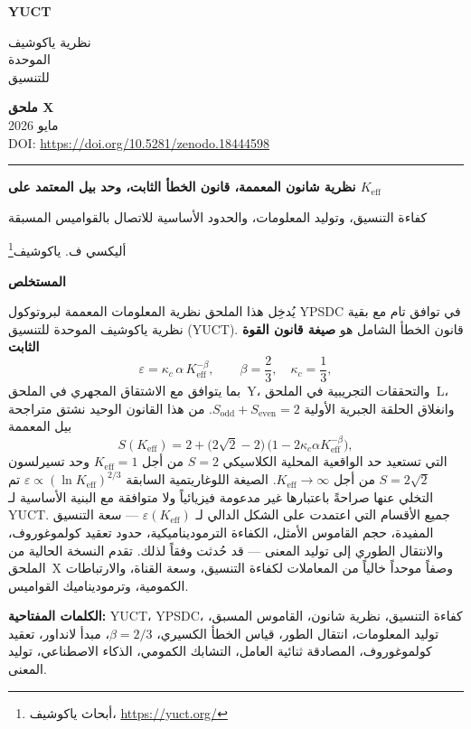 \documentclass[12pt,a4paper]{article}
\theoremstyle{remark}
\newcommand{\makeheader}{%
	\noindent
	\begin{minipage}{0.17\textwidth}
		\raggedright
		{\sffamily\bfseries\color{skyblue}\fontsize{46}{46}\selectfont YUCT}%
	\end{minipage}%
	\hspace{30pt}
	\begin{minipage}{0.32\textwidth}
		\raggedright
		{\sffamily\fontsize{11}{13}\selectfont نظرية ياكوشيف\\ الموحدة\\ للتنسيق}%
	\end{minipage}%
	\hfill
	\begin{minipage}{0.38\textwidth}
		\raggedleft
		{\sffamily\bfseries ملحق X}\\
		{\sffamily مايو 2026}\\
		{\sffamily\footnotesize \scriptsize DOI: \url{https://doi.org/10.5281/zenodo.18444598}}%
	\end{minipage}
	\par\vspace{5pt}
	\noindent\textcolor{gold}{\rule{\textwidth}{1.6pt}}
	\par\vspace{0pt}
}
\begin{document}
	\thispagestyle{firstpage}
	\makeheader
	
	\vspace{0cm}
	{\LARGE\bfseries نظرية شانون المعممة، قانون الخطأ الثابت، وحد بيل المعتمد على \(K_{\mathrm{eff}}\) \par}
	\vspace{0.2cm}
	{\Large كفاءة التنسيق، وتوليد المعلومات، والحدود الأساسية للاتصال بالقواميس المسبقة \par}
	\vspace{0.2cm}
	
	{\large أليكسي ف. ياكوشيف\footnote{أبحاث ياكوشيف، \url{https://yuct.org/}}} \\
	\vspace{0.0cm}
	
	{\color{darkblue}\textbf{\LARGE المستخلص}} \par
	{\large
		\noindent
		يُدخِل هذا الملحق نظرية المعلومات المعممة لبروتوكول YPSDC في توافق تام مع بقية نظرية ياكوشيف الموحدة للتنسيق (YUCT). قانون الخطأ الشامل هو \textbf{صيغة قانون القوة الثابت}
		\[
		\varepsilon = \kappa_c \, \alpha \, K_{\mathrm{eff}}^{-\beta},
		\qquad \beta = \frac{2}{3},\quad \kappa_c = \frac{1}{3},
		\]
		بما يتوافق مع الاشتقاق المجهري في الملحق~Y، والتحققات التجريبية في الملحق~L، وانغلاق الحلقة الجبرية الأولية \(S_{\mathrm{odd}}+S_{\mathrm{even}}=2\). من هذا القانون الوحيد نشتق متراجحة بيل المعممة
		\[
		S(K_{\mathrm{eff}}) = 2 + \bigl(2\sqrt{2}-2\bigr)\,
		\bigl(1 - 2\kappa_c\alpha K_{\mathrm{eff}}^{-\beta}\bigr),
		\]
		التي تستعيد حد الواقعية المحلية الكلاسيكي \(S=2\) من أجل \(K_{\mathrm{eff}}=1\) وحد تسيرلسون \(S=2\sqrt{2}\) من أجل \(K_{\mathrm{eff}}\to\infty\). الصيغة اللوغاريتمية السابقة \(\varepsilon\propto(\ln K_{\mathrm{eff}})^{2/3}\) تم التخلي عنها صراحةً باعتبارها غير مدعومة فيزيائياً ولا متوافقة مع البنية الأساسية لـ YUCT. جميع الأقسام التي اعتمدت على الشكل الدالي لـ \(\varepsilon(K_{\mathrm{eff}})\) — سعة التنسيق المفيدة، حجم القاموس الأمثل، الكفاءة الترموديناميكية، حدود تعقيد كولموغوروف، والانتقال الطوري إلى توليد المعنى — قد حُدثت وفقاً لذلك. تقدم النسخة الحالية من الملحق~X وصفاً موحداً خالياً من المعاملات لكفاءة التنسيق، وسعة القناة، والارتباطات الكمومية، وترموديناميك القواميس.
	}
	
	\vspace{0.1cm}
	\noindent
	{\color{darkblue}\textbf{الكلمات المفتاحية:}} YUCT، YPSDC، كفاءة التنسيق، نظرية شانون، القاموس المسبق، توليد المعلومات، انتقال الطور، قياس الخطأ الكسيري، $\beta=2/3$، مبدأ لانداور، تعقيد كولموغوروف، المصادقة ثنائية العامل، التشابك الكمومي، الذكاء الاصطناعي، توليد المعنى.
	
\end{document}
